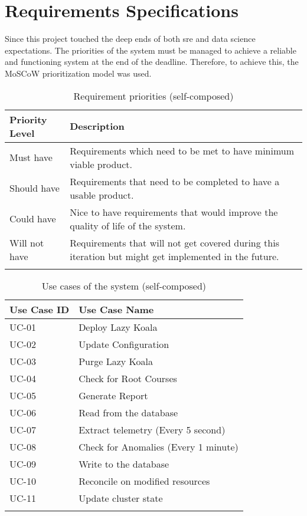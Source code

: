 \section{Requirements Specifications}

Since this project touched the deep ends of both \ac{sre} and data science expectations. The priorities of the system must be managed to achieve a reliable and functioning system at the end of the deadline. Therefore, to achieve this, the MoSCoW prioritization model was used.

\begin{longtable}{|p{25mm}|p{128mm}|}
\hline
    \textbf{Priority Level} &
    \textbf{Description} \\ \hline
    
    Must have  &
    Requirements which need to be met to have minimum viable product. \\ \hline

    Should have &
    Requirements that need to be completed to have a usable product. \\ \hline

    Could have &
    Nice to have requirements that would improve the quality of life of the system. \\ \hline
    
    Will not have &
    Requirements that will not get covered during this iteration but might get implemented in the future.\\ \hline
\caption{Requirement priorities (self-composed)}
\end{longtable}

\begin{longtable}{|p{35mm}|p{118mm}|}
\hline
    \textbf{Use Case ID} & \textbf{Use Case Name }              \\ \hline
    UC-01                & Deploy Lazy Koala                    \\ \hline
    UC-02                & Update Configuration                 \\ \hline
    UC-03                & Purge Lazy Koala                     \\ \hline
    UC-04                & Check for Root Courses               \\ \hline
    UC-05                & Generate Report                      \\ \hline
    UC-06                & Read from the database               \\ \hline
    UC-07                & Extract telemetry (Every 5 second)   \\ \hline
    UC-08                & Check for Anomalies (Every 1 minute) \\ \hline
    UC-09                & Write to the database                \\ \hline
    UC-10                & Reconcile on modified resources      \\ \hline
    UC-11                & Update cluster state                 \\ \hline
\caption{Use cases of the system (self-composed)}
\end{longtable}


